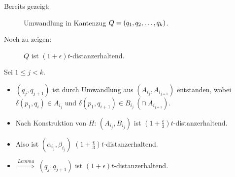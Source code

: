 \documentclass{beamer}
\begin{document}
	\begin{frame}
		\begin{description}
			\item[Bereits gezeigt: ] Umwandlung in Kantenzug $Q = (q_1, q_2, \mathellipsis, q_k)$.
			\item[Noch zu zeigen: ] $Q$ ist $(1 + \epsilon)t$-distanzerhaltend.
		\end{description}
		
		Sei $1 \leq j < k$.
		
		\begin{itemize}
			\item<2-> $(q_j, q_{j+1})$ ist durch Umwandlung aus $(A_{i_j}, A_{i_{j+1}})$ entstanden, wobei $\delta(p_1, q_i) \in A_{i_j}$ und $\delta(p_1, q_{i+1}) \in B_{i_j}\ (\cap\ A_{i_{j+1}})$.
			
			\item<3-> Nach Konstruktion von $H$: $(A_{i_j}, B_{i_j})$ ist $(1 + \frac{\epsilon}{3})t$-distanzerhaltend.
			
			\item<4-> Also ist $(\alpha_{i_j}, \beta_{i_j})$ $(1 + \frac{\epsilon}{3})t$-distanzerhaltend.
			
			\item<5-> $\stackrel{Lemma}{\Rightarrow}$ $(q_j, q_{j+1})$ ist $(1 + \epsilon)t$-distanzerhaltend.
		\end{itemize}
		
	\end{frame}
\end{document}

